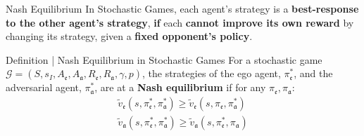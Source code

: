 \documentclass[10pt, aspectratio=169]{beamer}
\newcommand{\evidenzia}[1]{\textcolor{verdeSalvia}{\textbf{#1}}}
\begin{document}
\begin{frame}{Nash Equilibrium}
    \vspace{0.5cm}
    In Stochastic Games, each agent's strategy is a \evidenzia{best-response to the other agent's strategy}, \evidenzia{if} each \evidenzia{cannot improve its own reward} by changing its strategy, given a \evidenzia{fixed opponent's policy}.
    \vspace{0.5cm}
    \begin{block}{Definition | Nash Equilibrium in Stochastic Games}
        For a stochastic game $\mathcal{G} = (S, s_I, A_{\mathfrak{e}}, A_{\mathfrak{a}}, R_{\mathfrak{e}}, R_{\mathfrak{a}}, \gamma, p)$, the strategies of the ego agent, $\pi_\mathfrak{e}^*$, and the adversarial agent, $\pi_\mathfrak{a}^*$, are at a \evidenzia{Nash equilibrium} if for any $\pi_\mathfrak{e},\pi_\mathfrak{a}$:
        \begin{align*}
            \tilde{v}_\mathfrak{e}(s, \pi_\mathfrak{e}^*, \pi_\mathfrak{a}^*) \geq \tilde{v}_\mathfrak{e}(s, \pi_\mathfrak{e}, \pi_\mathfrak{a}^*)\\
            \tilde{v}_\mathfrak{a}(s, \pi_\mathfrak{e}^*, \pi_\mathfrak{a}^*) \geq \tilde{v}_\mathfrak{a}(s, \pi_\mathfrak{e}^*, \pi_\mathfrak{a})
        \end{align*}
     \end{block}
    \vspace{0.2cm}{\footnotesize With $\ ^*$ defining a fixed point of stability } 

\end{frame}

\end{document}
